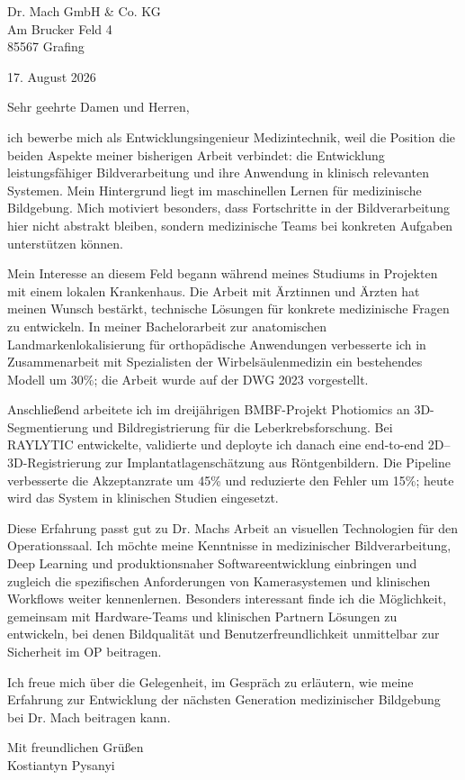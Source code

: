 \documentclass[11pt,a4paper]{article}
\begin{document}
Dr. Mach GmbH \& Co. KG\\
Am Brucker Feld 4\\
85567 Grafing

\begin{flushright}
17. August 2026
\end{flushright}

Sehr geehrte Damen und Herren,

ich bewerbe mich als Entwicklungsingenieur Medizintechnik, weil die Position die beiden Aspekte meiner bisherigen Arbeit verbindet: die Entwicklung leistungsfähiger Bildverarbeitung und ihre Anwendung in klinisch relevanten Systemen. Mein Hintergrund liegt im maschinellen Lernen für medizinische Bildgebung. Mich motiviert besonders, dass Fortschritte in der Bildverarbeitung hier nicht abstrakt bleiben, sondern medizinische Teams bei konkreten Aufgaben unterstützen können.

Mein Interesse an diesem Feld begann während meines Studiums in Projekten mit einem lokalen Krankenhaus. Die Arbeit mit Ärztinnen und Ärzten hat meinen Wunsch bestärkt, technische Lösungen für konkrete medizinische Fragen zu entwickeln. In meiner Bachelorarbeit zur anatomischen Landmarkenlokalisierung für orthopädische Anwendungen verbesserte ich in Zusammenarbeit mit Spezialisten der Wirbelsäulenmedizin ein bestehendes Modell um 30\%; die Arbeit wurde auf der DWG 2023 vorgestellt.

Anschließend arbeitete ich im dreijährigen BMBF-Projekt Photiomics an 3D-Segmentierung und Bildregistrierung für die Leberkrebsforschung. Bei RAYLYTIC entwickelte, validierte und deployte ich danach eine end-to-end 2D--3D-Registrierung zur Implantatlagenschätzung aus Röntgenbildern. Die Pipeline verbesserte die Akzeptanzrate um 45\% und reduzierte den Fehler um 15\%; heute wird das System in klinischen Studien eingesetzt.

Diese Erfahrung passt gut zu Dr. Machs Arbeit an visuellen Technologien für den Operationssaal. Ich möchte meine Kenntnisse in medizinischer Bildverarbeitung, Deep Learning und produktionsnaher Softwareentwicklung einbringen und zugleich die spezifischen Anforderungen von Kamerasystemen und klinischen Workflows weiter kennenlernen. Besonders interessant finde ich die Möglichkeit, gemeinsam mit Hardware-Teams und klinischen Partnern Lösungen zu entwickeln, bei denen Bildqualität und Benutzerfreundlichkeit unmittelbar zur Sicherheit im OP beitragen.

Ich freue mich über die Gelegenheit, im Gespräch zu erläutern, wie meine Erfahrung zur Entwicklung der nächsten Generation medizinischer Bildgebung bei Dr. Mach beitragen kann.

Mit freundlichen Grüßen\\
Kostiantyn Pysanyi
\end{document}
